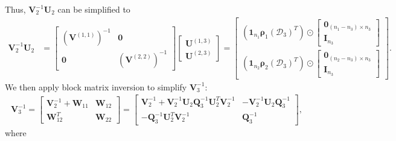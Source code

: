 \documentclass[12pt]{article}
\newcommand{\bs}[1]{\boldsymbol{#1}}
\begin{document}
Thus, $\bs{V}_2^{-1}\bs{U}_2$ can be simplified to
\begin{align*}
    \bs{V}_2^{-1}\bs{U}_2 &= \begin{bmatrix}
        (\bs{V}^{(1,1)})^{-1} & \bs{0}\\
        \bs{0} & (\bs{V}^{(2,2)})^{-1}
    \end{bmatrix}
    \begin{bmatrix}
        \bs{U}^{(1,3)}\\
        \bs{U}^{(2,3)}
    \end{bmatrix} 
    = \begin{bmatrix}
        (\bs{1}_{n_1}\bs{\rho}_1(\mathcal{D}_3)^T)\odot \begin{bmatrix}
            \bs{0}_{(n_1-n_3)\times n_3}\\
            \bs{I}_{n_3}
        \end{bmatrix}\\
        (\bs{1}_{n_2}\bs{\rho}_2(\mathcal{D}_3)^T)\odot \begin{bmatrix}
            \bs{0}_{(n_2-n_3)\times n_3}\\
            \bs{I}_{n_3}
        \end{bmatrix}
    \end{bmatrix}.
\end{align*}
We then apply block matrix inversion to simplify $\bs{V}_3^{-1}$:
\begin{align*}
    \bs{V}_3^{-1} =\begin{bmatrix}
        \bs{V}_2^{-1}+\bs{W}_{11} & \bs{W}_{12}\\
        \bs{W}_{12}^T & \bs{W}_{22}
    \end{bmatrix}
    = \begin{bmatrix}
        \bs{V}_2^{-1}+\bs{V}_2^{-1}\bs{U}_2\bs{Q}_3^{-1}\bs{U}_2^T\bs{V}_2^{-1} & -\bs{V}_2^{-1}\bs{U}_2\bs{Q}_3^{-1} \\
        -\bs{Q}_3^{-1}\bs{U}_2^T\bs{V}_2^{-1} & \bs{Q}_3^{-1}
    \end{bmatrix},
\end{align*}
where 
\small
\end{document}
